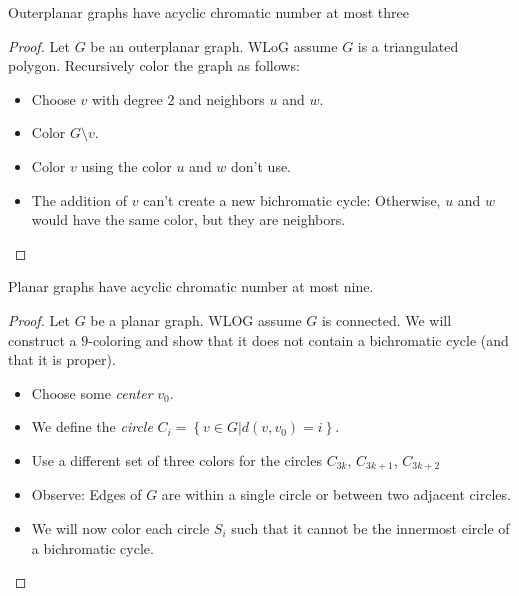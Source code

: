 \documentclass[t]{beamer}
\begin{document}
\begin{frame}
    \begin{theorem}
	Outerplanar graphs have acyclic chromatic number at most three
    \end{theorem}
    \pause
    \begin{proof}
	Let $G$ be an outerplanar graph. \pause WLoG assume $G$ is a triangulated polygon. Recursively color the graph as follows:\pause
	\begin{itemize}
	    \item Choose $v$ with degree $2$ and neighbors $u$ and $w$.
		\pause
	    \item Color $G\setminus v$.
		\pause
	    \item Color $v$ using the color $u$ and $w$ don't use. 
		\pause
	    \item The addition of $v$ can't create a new bichromatic cycle: Otherwise, $u$ and $w$ would have the same color, but they are neighbors.
	\end{itemize}
    \end{proof}
\end{frame}

\begin{frame}
    \begin{theorem}
	Planar graphs have acyclic chromatic number at most nine.
    \end{theorem}
    \pause
    \begin{proof}
	Let $G$ be a planar graph. \pause WLOG assume $G$ is connected. \pause We will construct a $9$-coloring and show that it does not contain a bichromatic cycle \pause (and that it is proper).
	\begin{itemize}
		\pause
	    \item Choose some \textit{center} $v_0$.
		\pause
	    \item We define the \emph{circle} $C_i = \left\{v \in G | d(v, v_0)=i\right\}$. 
		\pause
	    \item Use a different set of three colors for the circles $C_{3k}$, $C_{3k+1}$, $C_{3k+2}$
		\pause
	    \item Observe: Edges of $G$ are within a single circle or between two adjacent circles.
		\pause
	    \item We will now color each circle $S_i$ such that it cannot be the innermost circle of a bichromatic cycle.
	\end{itemize}
	\phantom\qedhere
    \end{proof}
\end{frame}
\end{document}
